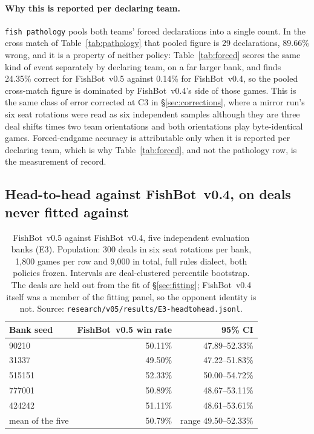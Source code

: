 \documentclass[11pt]{article}
\theoremstyle{definition}
\DeclareRobustCommand{\vfive}{\texorpdfstring{\mbox{FishBot v0.5}}{FishBot v0.5}}
\DeclareRobustCommand{\vfour}{\texorpdfstring{\mbox{FishBot v0.4}}{FishBot v0.4}}
\providecommand{\numHeadWin}{50.79}
\providecommand{\numHeadRange}{49.50--52.33}
\providecommand{\numHeadGames}{9{,}000}
\providecommand{\numHeadGames}{9{,}000}
\providecommand{\numVfiveForcedAcc}{24.35}
\providecommand{\numVfourForcedAcc}{0.14}
\providecommand{\numHeadSeedFive}{424242}
\providecommand{\numHeadSeedFour}{777001}
\providecommand{\numHeadSeedOne}{90210}
\providecommand{\numHeadSeedThree}{515151}
\providecommand{\numHeadSeedTwo}{31337}
\providecommand{\numCrossForced}{29}
\providecommand{\numCrossForcedWrong}{89.66}
\providecommand{\numHeadCIFive}{48.61--53.61}
\providecommand{\numHeadCIFour}{48.67--53.11}
\providecommand{\numHeadCIOne}{47.89--52.33}
\providecommand{\numHeadCIThree}{50.00--54.72}
\providecommand{\numHeadCITwo}{47.22--51.83}
\providecommand{\numHeadWinFive}{51.11}
\providecommand{\numHeadWinFour}{50.89}
\providecommand{\numHeadWinOne}{50.11}
\providecommand{\numHeadWinThree}{52.33}
\providecommand{\numHeadWinTwo}{49.50}
\providecommand{\numHeadBankDeals}{300}
\providecommand{\numHeadBankGames}{1{,}800}
\begin{document}
\paragraph{Why this is reported per declaring team.} \texttt{fish pathology}
pools both teams' forced declarations into a single count. In the cross match of
Table~\ref{tab:pathology} that pooled figure is \numCrossForced{} declarations,
\numCrossForcedWrong\% wrong, and it is a property of neither policy:
Table~\ref{tab:forced} scores the same kind of event separately by declaring team,
on a far larger bank, and finds \numVfiveForcedAcc\% correct for
\vfive{} against \numVfourForcedAcc\% for \vfour{}, so the pooled cross-match
figure is dominated by \vfour{}'s side of those games. This is the same class of
error corrected at C3 in \S\ref{sec:corrections}, where a mirror run's six seat
rotations were read as six independent samples although they are three deal
shifts times two team orientations and both orientations play byte-identical
games. Forced-endgame accuracy is attributable only when it is reported per
declaring team, which is why Table~\ref{tab:forced}, and not the pathology row,
is the measurement of record.

\subsection{Head-to-head against \vfour{}, on deals never fitted against}
\label{sec:results-h2h}

\begin{table}[t]
\centering
\caption{\vfive{} against \vfour{}, five independent evaluation banks (E3).
Population: \numHeadBankDeals{} deals in six seat rotations per bank,
\numHeadBankGames{} games per row and \numHeadGames{} in total, full rules dialect,
both policies frozen. Intervals are deal-clustered percentile bootstrap. The
deals are held out from the fit of \S\ref{sec:fitting}; \vfour{} itself was a
member of the fitting panel, so the opponent identity is not. Source:
\texttt{research/v05/results/E3-headtohead.jsonl}.}
\label{tab:h2h}
\small
\begin{tabular}{lrr}
\toprule
\textbf{Bank seed} & \textbf{\vfive{} win rate} & \textbf{95\% CI} \\
\midrule
\numHeadSeedOne{}   & \numHeadWinOne\%   & \numHeadCIOne\% \\
\numHeadSeedTwo{}   & \numHeadWinTwo\%   & \numHeadCITwo\% \\
\numHeadSeedThree{} & \numHeadWinThree\% & \numHeadCIThree\% \\
\numHeadSeedFour{}  & \numHeadWinFour\%  & \numHeadCIFour\% \\
\numHeadSeedFive{}  & \numHeadWinFive\%  & \numHeadCIFive\% \\
\midrule
mean of the five    & \numHeadWin\%      & range \numHeadRange\% \\
\bottomrule
\end{tabular}
\end{table}
\end{document}
